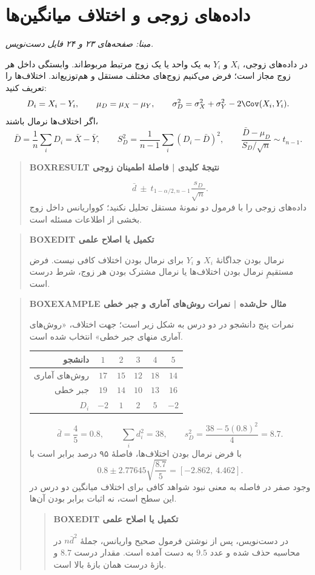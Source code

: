 \section{داده‌های زوجی و اختلاف میانگین‌ها}
\textit{مبنا: صفحه‌های ۲۳ و ۲۴ فایل دست‌نویس.}\par 
در داده‌های زوجی، $X_i$ و $Y_i$ به یک واحد یا یک زوج مرتبط مربوط‌اند. وابستگی داخل هر زوج مجاز است؛ فرض می‌کنیم زوج‌های مختلف مستقل و هم‌توزیع‌اند. اختلاف‌ها را تعریف کنید:
\[
D_i=X_i-Y_i,\qquad
\mu_D=\mu_X-\mu_Y,
\qquad\sigma_D^2=\sigma_X^2+\sigma_Y^2-2\Cov(X_i,Y_i).
\]
اگر اختلاف‌ها نرمال باشند،
\[
\bar D=\frac1n\sum_iD_i=\bar X-\bar Y,\qquad
S_D^2=\frac1{n-1}\sum_i(D_i-\bar D)^2,
\qquad
\frac{\bar D-\mu_D}{S_D/\sqrt n}\sim t_{n-1}.
\]
\begin{quote}\textbf{BOXRESULT نتیجهٔ کلیدی | فاصلهٔ اطمینان زوجی}\par 
\[\boxed{\bar d\ \pm\ t_{1-\alpha/2,n-1}\frac{s_D}{\sqrt n}.}\]
داده‌های زوجی را با فرمول دو نمونهٔ مستقل تحلیل نکنید؛ کوواریانس داخل زوج بخشی از اطلاعات مسئله است.
\end{quote}
\begin{quote}\textbf{BOXEDIT تکمیل یا اصلاح علمی}\par نرمال بودن جداگانهٔ $X_i$ و $Y_i$ برای نرمال بودن اختلاف کافی نیست. فرض مستقیمِ نرمال بودن اختلاف‌ها یا نرمال مشترک بودن هر زوج، شرط درست است.\end{quote}
\begin{quote}\textbf{BOXEXAMPLE مثال حل‌شده | نمرات روش‌های آماری و جبر خطی}\par 
نمرات پنج دانشجو در دو درس به شکل زیر است؛ جهت اختلاف، «روش‌های آماری منهای جبر خطی» انتخاب شده است.

\begin{tabular}{r|ccccc}
\toprule
دانشجو&$1$&$2$&$3$&$4$&$5$\\
\midrule
روش‌های آماری&$17$&$15$&$12$&$18$&$14$\\
جبر خطی&$19$&$14$&$10$&$13$&$16$\\
$D_i$&$-2$&$1$&$2$&$5$&$-2$\\
\bottomrule
\end{tabular}

\[
\bar d=\frac45=0.8,\qquad \sum_i d_i^2=38,
\qquad s_D^2=\frac{38-5(0.8)^2}{4}=\boxed{8.7}.
\]
با فرض نرمال بودن اختلاف‌ها، فاصلهٔ ۹۵ درصد برابر است با
\[
0.8\pm2.77645\sqrt{\frac{8.7}{5}}
=\boxed{[-2.862,\ 4.462]}.
\]
وجود صفر در فاصله به معنی نبود شواهد کافی برای اختلاف میانگین دو درس در این سطح است، نه اثبات برابر بودن آن‌ها.
\begin{quote}\textbf{BOXEDIT تکمیل یا اصلاح علمی}\par در دست‌نویس، پس از نوشتن فرمول صحیح واریانس، جملهٔ $n\bar d^2$ در محاسبه حذف شده و عدد $9.5$ به دست آمده است. مقدار درست $8.7$ و بازهٔ درست همان بازهٔ بالا است.\end{quote}
\end{quote}
